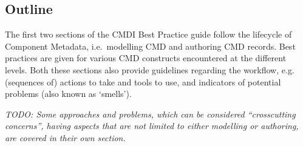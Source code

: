 \subsection{Outline}\label{outline}

The first two sections of the CMDI Best Practice guide follow the
lifecycle of Component Metadata, i.e.~modelling CMD and authoring CMD
records. Best practices are given for various CMD constructs encountered
at the different levels. Both these sections also provide guidelines
regarding the workflow, e.g. (sequences of) actions to take and tools to
use, and indicators of potential problems (also known as `smells').

\emph{TODO: Some approaches and problems, which can be considered
``crosscutting concerns'', having aspects that are not limited to either
modelling or authoring, are covered in their own section.}
